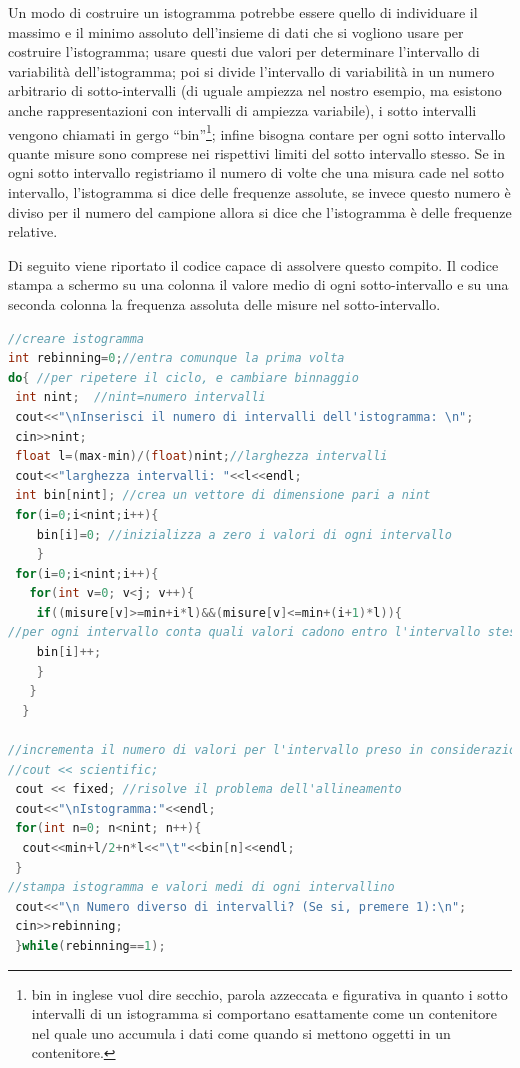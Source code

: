 \documentclass[11pt,fleqn]{book} %
\begin{document}
Un modo di costruire un istogramma potrebbe essere quello di individuare il massimo e il minimo assoluto dell'insieme di dati che si vogliono usare per costruire l'istogramma; usare questi due valori per determinare l'intervallo di variabilità dell'istogramma; poi si divide l'intervallo di variabilità in un numero arbitrario di sotto-intervalli (di uguale ampiezza nel nostro esempio, ma esistono anche rappresentazioni con intervalli di ampiezza variabile), i sotto intervalli vengono chiamati in gergo ``bin''\footnote{bin in inglese vuol dire secchio, parola azzeccata e figurativa in quanto i sotto intervalli di un istogramma si comportano esattamente come un contenitore nel quale uno accumula i dati come quando si mettono oggetti in un contenitore.}; infine bisogna contare per ogni sotto intervallo quante misure sono comprese nei rispettivi limiti del sotto intervallo stesso.
Se in ogni sotto intervallo registriamo il numero di volte che una misura cade nel sotto intervallo, l'istogramma si dice delle frequenze assolute, se invece questo numero è diviso per il numero del campione allora si dice che l'istogramma è delle frequenze relative.

Di seguito viene riportato il codice capace di assolvere questo compito. Il codice stampa a schermo su una colonna il valore medio di ogni sotto-intervallo e su una seconda colonna la frequenza assoluta delle misure nel sotto-intervallo.

\begin{lstlisting}[language=c++]
//creare istogramma
int rebinning=0;//entra comunque la prima volta
do{ //per ripetere il ciclo, e cambiare binnaggio
 int nint;  //nint=numero intervalli
 cout<<"\nInserisci il numero di intervalli dell'istogramma: \n";
 cin>>nint;
 float l=(max-min)/(float)nint;//larghezza intervalli          
 cout<<"larghezza intervalli: "<<l<<endl;
 int bin[nint]; //crea un vettore di dimensione pari a nint
 for(i=0;i<nint;i++){
	bin[i]=0; //inizializza a zero i valori di ogni intervallo
	}
 for(i=0;i<nint;i++){
   for(int v=0; v<j; v++){
    if((misure[v]>=min+i*l)&&(misure[v]<=min+(i+1)*l)){ 
//per ogni intervallo conta quali valori cadono entro l'intervallo stesso 
    bin[i]++;
    }
   }
  }
                                               
//incrementa il numero di valori per l'intervallo preso in considerazione
//cout << scientific;
 cout << fixed; //risolve il problema dell'allineamento
 cout<<"\nIstogramma:"<<endl;
 for(int n=0; n<nint; n++){                                         
  cout<<min+l/2+n*l<<"\t"<<bin[n]<<endl;                
 }
//stampa istogramma e valori medi di ogni intervallino
 cout<<"\n Numero diverso di intervalli? (Se si, premere 1):\n";
 cin>>rebinning;
 }while(rebinning==1);
\end{lstlisting} 
\end{document}
